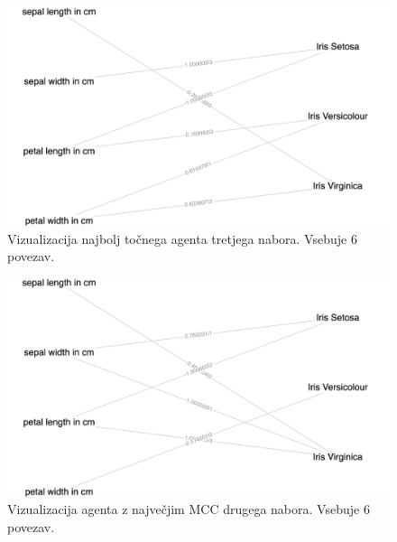 \begin{figure}[H]
    \begin{center}
        \includegraphics[width=13cm]{iris/3/acc_g}
    \end{center}
    \caption{Vizualizacija najbolj točnega agenta tretjega nabora. Vsebuje 6 povezav.}
    \label{fig:iris_acc_3_g}
\end{figure}

\begin{figure}[H]
    \begin{center}
        \includegraphics[width=13cm]{iris/3/mcc_g}
    \end{center}
    \caption{Vizualizacija agenta z največjim MCC drugega nabora. Vsebuje 6 povezav.}
    \label{fig:iris_mcc_3_g}
\end{figure}